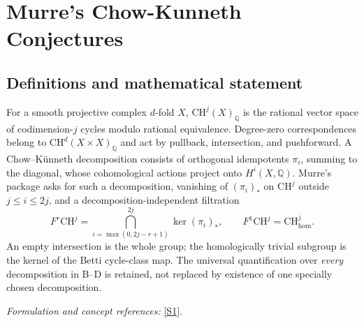 \documentclass[11pt]{article}
\newcommand{\Q}{\mathbb{Q}}
\newcommand{\sref}[2]{\hyperlink{source:#1:#2}{[S#2]}}
\newif\ifshowcatalogue
\newcommand{\cataloguescope}[1]{\ifshowcatalogue
 \paragraph{Exact scope in the supplied catalogue.}
 \begin{quote}\small #1\end{quote}\fi}
\begin{document}
\setcounter{section}{0}
\clearpage
\section*{\texorpdfstring{Murre's Chow-Kunneth Conjectures}{Murre's Chow-Kunneth Conjectures}}\label{statement}
\subsection{Definitions and mathematical statement}
For a smooth projective complex $d$-fold $X$, $\mathrm{CH}^j(X)_{\Q}$ is the rational vector space of codimension-$j$ cycles modulo rational equivalence. Degree-zero correspondences belong to $\mathrm{CH}^d(X\times X)_{\Q}$ and act by pullback, intersection, and pushforward. A Chow--K\"unneth decomposition consists of orthogonal idempotents $\pi_i$, summing to the diagonal, whose cohomological actions project onto $H^i(X,\Q)$. Murre's package asks for such a decomposition, vanishing of $(\pi_i)_*$ on $\mathrm{CH}^j$ outside $j\le i\le2j$, and a decomposition-independent filtration
\[
 F^r\mathrm{CH}^j=\bigcap_{i=\max(0,2j-r+1)}^{2j}\ker(\pi_i)_*,
 \qquad F^1\mathrm{CH}^j=\mathrm{CH}^j_{\mathrm{hom}}.
\]
An empty intersection is the whole group; the homologically trivial subgroup is the kernel of the Betti cycle-class map. The universal quantification over \emph{every} decomposition in B--D is retained, not replaced by existence of one specially chosen decomposition.
\par\smallskip\textit{Formulation and concept references:} \sref{statement}{1}.
\cataloguescope{For every smooth projective irreducible complex variety X of dimension d, let CH\textasciicircum{}j(X)\_Q denote cycles modulo rational equivalence, with Betti Q-cohomology. A correspondence pi in CH\textasciicircum{}d(X x X)\_Q acts by pi\_*(a)=(p\_2)\_*(p\_1\textasciicircum{}*(a).pi). Murre's full A-D package asserts: (A) there exists a Chow-Kunneth decomposition, namely mutually orthogonal composition-idempotents pi\_0,...,pi\_(2d) in CH\textasciicircum{}d(X x X)\_Q summing to the diagonal and inducing projection onto H\textasciicircum{}i(X,Q) for pi\_i; (B) for EVERY such decomposition and 0<=j<=d, pi\_i acts as zero on CH\textasciicircum{}j when i<j or i>2j; (C) for EVERY such decomposition define F\textasciicircum{}r CH\textasciicircum{}j as the intersection of ker(pi\_i)\_* for max(0,2j-r+1)<=i<=2j, r>=0, with empty intersection F\textasciicircum{}0=CH\textasciicircum{}j; these filtrations are equal for ALL decompositions satisfying A; (D) for EVERY such decomposition, F\textasciicircum{}1 CH\textasciicircum{}j equals ker(CH\textasciicircum{}j(X)\_Q -> H\textasciicircum{}(2j)(X,Q)). Under A and B, F\textasciicircum{}(j+1)=0. No multiplicative or self-dual decomposition, explicit construction algorithm, functorial-extra requirement, or arbitrary-base-field enlargement is included.}
\end{document}
